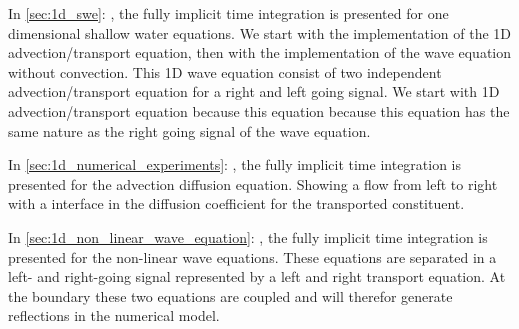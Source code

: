 In \autoref{sec:1d_swe}: , the fully implicit time integration is presented for one dimensional shallow water equations.
We start with the implementation of the 1D advection/transport equation, then with the implementation of the wave equation without convection.
This 1D wave equation consist of two independent advection/transport equation for a right and left going signal.
We start with 1D advection/transport equation because this equation because this equation has the same nature as the right going signal of the wave equation.



In \autoref{sec:1d_numerical_experiments}: , the fully implicit time integration is presented for the advection diffusion equation.
Showing a flow from left to right with a interface in the diffusion coefficient for the transported constituent.

In \autoref{sec:1d_non_linear_wave_equation}: , the fully implicit time integration is presented for the non-linear wave equations.
These equations are separated in a left- and right-going signal represented by a left and right transport equation.
At the boundary these two equations are coupled and will therefor generate reflections in the numerical model.


